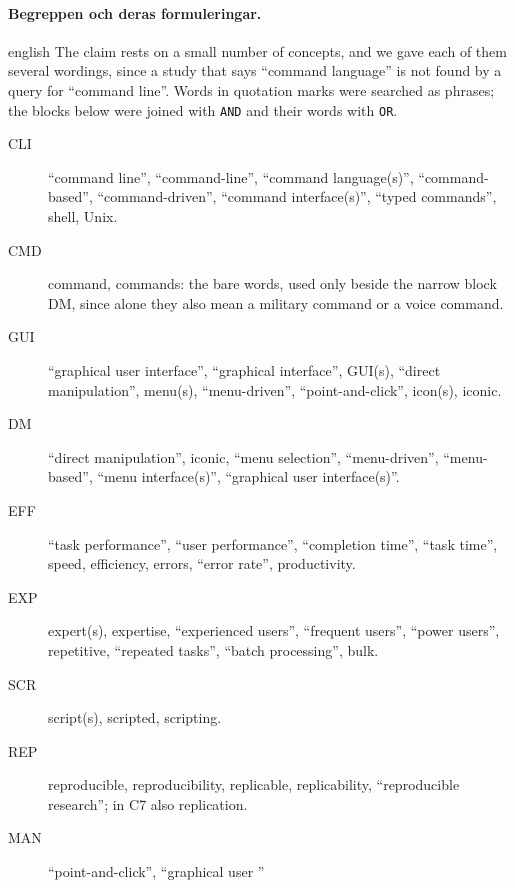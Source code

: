 \paragraph{%
  {Begreppen och deras formuleringar.}} %
\begin{onlyin}{english} %
The claim rests on a small number of concepts, and we gave each of
them several wordings, since a study that says \enquote{command
language} is not found by a query for \enquote{command line}.  Words in
quotation marks were searched as phrases; the blocks below were joined
with \texttt{AND} and their words with \texttt{OR}.
\begingroup\raggedright
\begin{description}
  \item[CLI] \enquote{command line}, \enquote{command-line},
    \enquote{command language(s)}, \enquote{command-based},
    \enquote{command-driven}, \enquote{command interface(s)},
    \enquote{typed commands}, shell, Unix.
  \item[CMD] command, commands: the bare words, used only beside the
    narrow block DM, since alone they also mean a military command or a
    voice command.
  \item[GUI] \enquote{graphical user interface}, \enquote{graphical
    interface}, GUI(s), \enquote{direct manipulation}, menu(s),
    \enquote{menu-driven}, \enquote{point-and-click}, icon(s), iconic.
  \item[DM] \enquote{direct manipulation}, iconic, \enquote{menu
    selection}, \enquote{menu-driven}, \enquote{menu-based},
    \enquote{menu interface(s)}, \enquote{graphical user
    interface(s)}.
  \item[EFF] \enquote{task performance}, \enquote{user performance},
    \enquote{completion time}, \enquote{task time}, speed, efficiency,
    errors, \enquote{error rate}, productivity.
  \item[EXP] expert(s), expertise, \enquote{experienced users},
    \enquote{frequent users}, \enquote{power users}, repetitive,
    \enquote{repeated tasks}, \enquote{batch processing}, bulk.
  \item[SCR] script(s), scripted, scripting.
  \item[REP] reproducible, reproducibility, replicable, replicability,
    \enquote{reproducible research}; in C7 also replication.
  \item[MAN] \enquote{point-and-click}, \enquote{graphical user
}
\end{description}
\end{onlyin}
